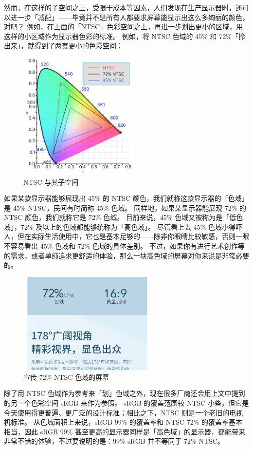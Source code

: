 然而，在这样的子空间之上，受限于成本等因素，人们发现在生产显示器时，还可以进一步「减配」——毕竟并不是所有人都要求屏幕能显示出这么多绚丽的颜色，对吧？
例如，在上面的「NTSC」色彩空间之上，再进一步划出更小的区域，用这样的小区域作为显示器色彩的标准。
例如，将 NTSC 色域的 45\% 和 72\%「拎出来」，就得到了两套更小的色彩空间：

\begin{figure}[htb!]
  \centering
  \includegraphics[width=6cm]{assets/NTSC_72_45.jpg}
  \caption{NTSC 与其子空间}
  \label{NTSC_72_45}
\end{figure}

如果某款显示器能够展现出 45\% 的 NTSC 颜色，我们就称这款显示器的「色域」是 45\% NTSC，民间有时简称 45\% 色域。
同样地，如果某显示器能展现 72\% 的 NTSC 颜色，我们就称它是 72\% 色域。
目前来说，45\% 色域又被称为是「低色域」，72\% 及以上的色域都能够统称为「高色域」。
尽管看上去 45\% 色域小得吓人，但在实际生活使用中，它也是基本足够的——除非你眼睛比较敏感，否则一眼不容易看出 45\% 色域和 72\% 色域的具体差别。
不过，如果你有进行艺术创作等的需求，或者单纯追求更舒适的体验，那么一块高色域的屏幕对你来说是非常必要的。

\begin{figure}[htb!]
  \centering
  \includegraphics[width=7cm]{assets/72_NTSC_Ad.jpg}
  \caption{宣传 72\% NTSC 色域的屏幕}
  \label{72_NTSC_Ad}
\end{figure}

除了用 NTSC 色域作为参考来「划」色域之外，现在很多厂商还会用上文中提到的另一个色彩空间 sRGB 来作为参照。
sRGB 的覆盖范围较 NTSC 小些，但它是今天使用得更普遍、更广泛的设计标准；相比之下，NTSC 则是一个老旧的电视机标准。
从色域面积上来说，sRGB 99\% 的覆盖率和 NTSC 72\% 的覆盖率基本相当，因此 sRGB 99\% 甚至更高的显示器同样是「高色域」的显示器，都能带来非常不错的体验，不过要说明的是：99\% sRGB 并不等同于 72\% NTSC。

